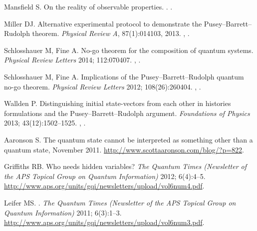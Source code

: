 \documentclass[DIV=calc,fontsize=12pt]{scrartcl} %
\theoremstyle{definition}
\theoremstyle{plain}
\begin{document}
\begin{thebibliography}{10}
Mansfield S.
\newblock On the reality of observable properties.
.
\newblock \href {http://arxiv.org/abs/1306.3216} {}.

Miller DJ.
\newblock Alternative experimental protocol to demonstrate the
Pusey--Barrett--Rudolph theorem.
\newblock \emph{Physical Review A}, 87(1):014103, 2013.
\newblock \href {http://arxiv.org/abs/1202.6465} {},
\href {http://dx.doi.org/10.1103/PhysRevA.87.014103}
{}.

Schlosshauer M, Fine A.
\newblock No-go theorem for the composition of quantum systems.
\newblock \emph{Physical Review Letters} 2014; 112:070407.
\newblock \href {http://arxiv.org/abs/1306.5805} {},
\href {http://dx.doi.org/10.1103/PhysRevLett.112.070407}
{}.

Schlosshauer M, Fine A.
\newblock Implications of the Pusey--Barrett--Rudolph quantum no-go theorem.
\newblock \emph{Physical Review Letters} 2012; 108(26):260404.
\newblock \href {http://arxiv.org/abs/1203.4779} {},
\href {http://dx.doi.org/10.1103/PhysRevLett.108.260404}
{}.

Wallden P.
\newblock Distinguishing initial state-vectors from each other in histories
formulations and the Pusey--Barrett--Rudolph argument.
\newblock \emph{Foundations of Physics} 2013; 43(12):1502--1525.
\newblock \href {http://arxiv.org/abs/1211.2084} {},
\href {http://dx.doi.org/10.1007/s10701-013-9759-8}
{}.

Aaronson S.
\newblock The quantum state cannot be interpreted as something other than a
quantum state, November 2011.
\newblock \url{http://www.scottaaronson.com/blog/?p=822}.

Griffiths RB.
\newblock Who needs hidden variables?
\newblock \emph{The Quantum Times (Newsletter of the APS Topical Group on
Quantum Information)} 2012; 6(4):4--5.
\newblock \url{http://www.aps.org/units/gqi/newsletters/upload/vol6num4.pdf}.

Leifer MS.
.
\newblock \emph{The Quantum Times (Newsletter of the APS Topical Group on
Quantum Information)} 2011; 6(3):1--3.
\newblock \url{http://www.aps.org/units/gqi/newsletters/upload/vol6num3.pdf}.


\end{thebibliography}
\end{document}
